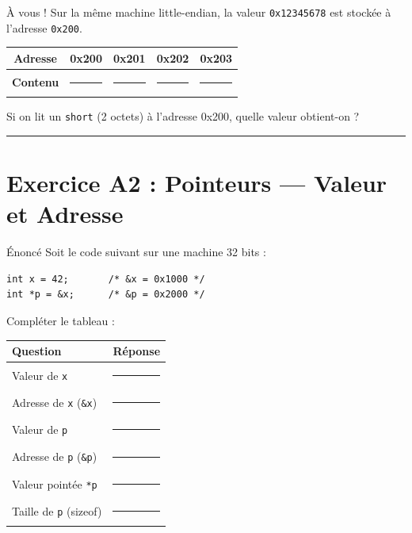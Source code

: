 \documentclass[10pt,a4paper]{article}
\begin{document}
\vspace{1em}

\begin{exercicebox}{À vous !}
Sur la même machine little-endian, la valeur \texttt{0x12345678} est stockée à l'adresse \texttt{0x200}.

\begin{center}
\renewcommand{\arraystretch}{1.5}
\begin{tabular}{|c|c|c|c|c|}
\hline
\textbf{Adresse} & 0x200 & 0x201 & 0x202 & 0x203 \\
\hline
\textbf{Contenu} & \rule{1.5cm}{0.4pt} & \rule{1.5cm}{0.4pt} & \rule{1.5cm}{0.4pt} & \rule{1.5cm}{0.4pt} \\
\hline
\end{tabular}
\end{center}

Si on lit un \texttt{short} (2 octets) à l'adresse 0x200, quelle valeur obtient-on ? \rule{2cm}{0.4pt}
\end{exercicebox}

\newpage
\section{Exercice A2 : Pointeurs — Valeur et Adresse}

\begin{exercicebox}{Énoncé}
Soit le code suivant sur une machine 32 bits :
\begin{lstlisting}
int x = 42;       /* &x = 0x1000 */
int *p = &x;      /* &p = 0x2000 */
\end{lstlisting}

Compléter le tableau :
\end{exercicebox}

\vspace{0.5em}

\begin{center}
\renewcommand{\arraystretch}{1.5}
\begin{tabular}{|l|c|}
\hline
\textbf{Question} & \textbf{Réponse} \\
\hline
Valeur de \texttt{x} & \rule{3cm}{0.4pt} \\
\hline
Adresse de \texttt{x} (\texttt{\&x}) & \rule{3cm}{0.4pt} \\
\hline
Valeur de \texttt{p} & \rule{3cm}{0.4pt} \\
\hline
Adresse de \texttt{p} (\texttt{\&p}) & \rule{3cm}{0.4pt} \\
\hline
Valeur pointée \texttt{*p} & \rule{3cm}{0.4pt} \\
\hline
Taille de \texttt{p} (sizeof) & \rule{3cm}{0.4pt} \\
\hline
\end{tabular}
\end{center}
\end{document}
